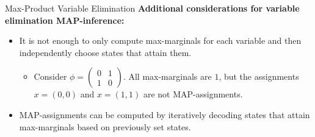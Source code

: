 \begin{frame}{Max-Product Variable Elimination}
    \textbf{Additional considerations for variable elimination MAP-inference:}
    \begin{itemize}
        \item It is not enough to only compute max-marginals for each variable and then independently choose states that attain them.
        \begin{itemize}
            \pause \item Consider $\phi = \begin{pmatrix} 0 & 1 \\ 1 & 0 \end{pmatrix}$. All max-marginals are $1$, but the assignments $x = (0,0)$ and $x = (1,1)$ are not MAP-assignments.
        \end{itemize}
        \pause \item MAP-assignments can be computed by iteratively decoding states that attain max-marginals based on previously set states.
    \end{itemize}
    \pause
    \begin{algorithm}[H]
       \caption{Max-Product Variable Elimination}
        \label{alg:max-product-variable-elimination}
            \pause
    \end{algorithm}
\end{frame}

